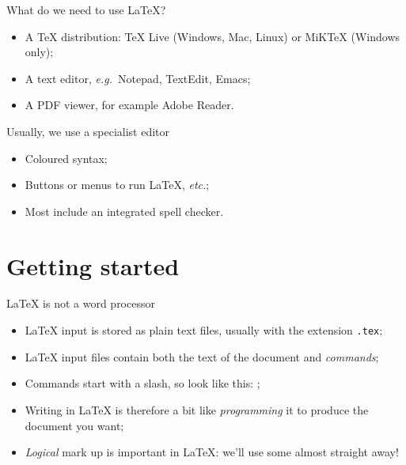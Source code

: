 \begin{frame}{What do we need to use \LaTeX{}?}

  \begin{itemize}
    \item A \TeX{} distribution: \TeX{} Live (Windows, Mac, Linux) or
      MiK\TeX{} (Windows only);
    \item A text editor, \emph{e.g.}~Notepad, TextEdit, Emacs;
    \item A PDF viewer, for example Adobe Reader.
  \end{itemize}

  \pause
  
  Usually, we use a specialist editor
  \begin{itemize}
    \item Coloured syntax;
    \item Buttons or menus to run \LaTeX{}, \emph{etc.};
    \item Most include an integrated spell checker.
  \end{itemize}
\end{frame}


\section{Getting started}

\begin{frame}{\LaTeX{} is not a word processor}

  \begin{itemize}
    \item \LaTeX{} input is stored as plain text files, usually with
      the extension \texttt{.tex};
    \item \LaTeX{} input files contain both the text of the document
      and \emph{commands};
    \item Commands start with a slash, so look like this:
      ;
    \item Writing in \LaTeX{} is therefore a bit like \emph{programming}
      it to produce the document you want;
    \item \emph{Logical} mark up is important in \LaTeX{}: we'll use some
      almost straight away!
  \end{itemize}

\end{frame}

